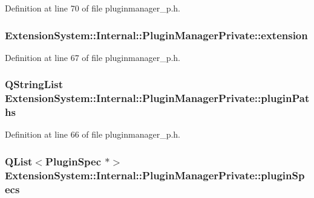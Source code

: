 \-Definition at line 70 of file pluginmanager\-\_\-p.\-h.

\hypertarget{class_extension_system_1_1_internal_1_1_plugin_manager_private_ac92959afcbee3882ac4df6bf9d00d6b2}{
\subsubsection[{extension}]{ {\bf \-Extension\-System\-::\-Internal\-::\-Plugin\-Manager\-Private\-::extension}}}\label{class_extension_system_1_1_internal_1_1_plugin_manager_private_ac92959afcbee3882ac4df6bf9d00d6b2}


\-Definition at line 67 of file pluginmanager\-\_\-p.\-h.

\hypertarget{class_extension_system_1_1_internal_1_1_plugin_manager_private_aab8385c194dea0ca7100ace14cd9ce29}{
\subsubsection[{plugin\-Paths}]{\setlength{\rightskip}{0pt plus 5cm}\-Q\-String\-List {\bf \-Extension\-System\-::\-Internal\-::\-Plugin\-Manager\-Private\-::plugin\-Paths}}}\label{class_extension_system_1_1_internal_1_1_plugin_manager_private_aab8385c194dea0ca7100ace14cd9ce29}


\-Definition at line 66 of file pluginmanager\-\_\-p.\-h.

\hypertarget{class_extension_system_1_1_internal_1_1_plugin_manager_private_a1654aed9c8c9d015cc3ef398f405613e}{
\subsubsection[{plugin\-Specs}]{\setlength{\rightskip}{0pt plus 5cm}\-Q\-List$<${\bf \-Plugin\-Spec} $\ast$$>$ {\bf \-Extension\-System\-::\-Internal\-::\-Plugin\-Manager\-Private\-::plugin\-Specs}}}\label{class_extension_system_1_1_internal_1_1_plugin_manager_private_a1654aed9c8c9d015cc3ef398f405613e}


